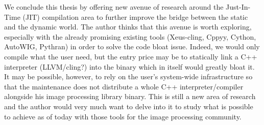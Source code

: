 We conclude this thesis by offering new avenue of research around the Just-In-Time (JIT) compilation area to further
improve the bridge between the static and the dynamic world. The author thinks that this avenue is worth exploring,
especially with the already promising existing tools (Xeus-cling, Cppyy, Cython, AutoWIG, Pythran) in order to solve the
code bloat issue. Indeed, we would only compile what the user need, but the entry price may be to statically link a C++
interpreter (LLVM/cling?) into the binary which in itself would greatly bloat it. It may be possible, however, to rely
on the user's system-wide infrastructure so that the maintenance does not distribute a whole C++ interpreter/compiler
alongside his image processing library binary. This is still a new area of research and the author would very much want
to delve into it to study what is possible to achieve as of today with those tools for the image processing community.





